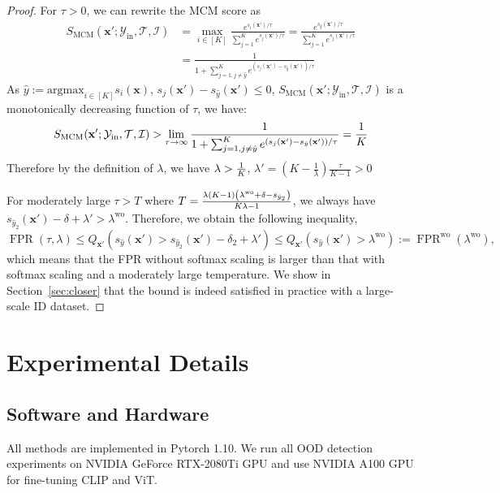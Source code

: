\documentclass{article}
\def\*#1{\mathbf{#1}}
\begin{document}
\begin{proof}
For $\tau > 0$, we can rewrite the MCM score as 
$$
\begin{aligned}
S_{\text{MCM}}(\*x';\mathcal{Y}_\text{in},\mathcal{T},\mathcal{I}) &= \max_{i\in[K]} \frac{e^{s_i(\*x')/\tau}}{\sum_{j=1}^K e^{s_j(\*x')/\tau}} =  \frac{e^{s_{\hat{y}}(\*x')/\tau}}{\sum_{j=1}^K e^{s_j(\*x')/\tau}} \\
&= \frac{1}{ 1 + \sum_{j=1, j \neq \hat{y}}^K e^{\left(s_j(\*x') -s_{\hat{y}}(\*x')\right)/\tau}}
\end{aligned}
$$
As $\hat y := \text{argmax}_{i\in[K]} s_i(\*x)$, $s_j(\*x') -s_{\hat{y}}(\*x') \leq 0$,  $S_{\text{MCM}}(\*x';\mathcal{Y}_\text{in},\mathcal{T},\mathcal{I}) $ is a monotonically decreasing function of $\tau$, we have: 
$$
S_{\text{MCM}}(\*x';\mathcal{Y}_\text{in},\mathcal{T},\mathcal{I}) > \lim_{\tau \rightarrow \infty}  \frac{1}{ 1 + \sum_{j=1, j \neq \hat{y}}^K e^{\left(s_j(\*x') -s_{\hat{y}}(\*x')\right)/\tau}} = {1\over K}
$$
Therefore by the definition of $\lambda$, we have $\lambda > {1\over K}$, $\lambda' = \left(K-\frac{1}{\lambda}\right) \frac{\tau}{K-1} > 0$

For moderately large $\tau > T$ where $T = { \lambda(K - 1)\left(\lambda^{\text{wo}} + \delta - s_{\hat{y}_{2}}\right) \over K\lambda-1} $,  we always have $s_{\hat{y}_{2}}(\*x')-\delta+\lambda' >\lambda^{\text{wo}} $. Therefore, we obtain the following inequality,
$$
\operatorname{FPR}(\tau, \lambda) \leq Q_{\*x'}\left(s_{\hat{y}}(\*x')> s_{\hat{y}_{2}}(\*x')-\delta_{2}+\lambda'\right)
\leq Q_{\*x'}\left(s_{\hat{y}}(\*x') >\lambda^{\text{wo}}\right) :=  \operatorname{FPR}^{\text{wo}}(\lambda^{\text{wo}}),
$$
which means that the FPR without softmax scaling is  larger than that with softmax scaling and a moderately large temperature. We show in Section~\ref{sec:closer} that the bound is indeed satisfied in practice with a large-scale ID dataset.
\end{proof}
\newpage
\section{Experimental Details}
\label{sec:exp_detail}

\subsection{Software and Hardware}
All methods are implemented in Pytorch 1.10. We run all OOD detection experiments on NVIDIA GeForce RTX-2080Ti GPU and use NVIDIA A100 GPU for fine-tuning CLIP and ViT.
\end{document}
